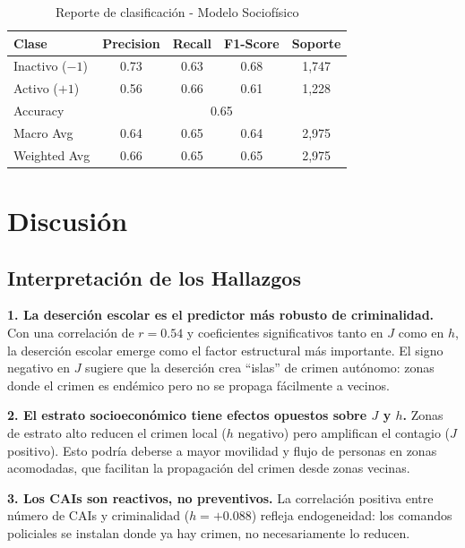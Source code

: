\documentclass[12pt,a4paper]{article}
\begin{document}
\begin{table}[H]
\centering
\caption{Reporte de clasificación - Modelo Sociofísico}
\label{tab:clasificacion}
\begin{tabular}{@{}lcccc@{}}
\toprule
\textbf{Clase} & \textbf{Precision} & \textbf{Recall} & \textbf{F1-Score} & \textbf{Soporte} \\
\midrule
Inactivo ($-1$) & 0.73 & 0.63 & 0.68 & 1,747 \\
Activo ($+1$) & 0.56 & 0.66 & 0.61 & 1,228 \\
\midrule
Accuracy & \multicolumn{4}{c}{0.65} \\
Macro Avg & 0.64 & 0.65 & 0.64 & 2,975 \\
Weighted Avg & 0.66 & 0.65 & 0.65 & 2,975 \\
\bottomrule
\end{tabular}
\end{table}

\section{Discusión}

\subsection{Interpretación de los Hallazgos}

\textbf{1. La deserción escolar es el predictor más robusto de criminalidad.} Con una correlación de $r=0.54$ y coeficientes significativos tanto en $J$ como en $h$, la deserción escolar emerge como el factor estructural más importante. El signo negativo en $J$ sugiere que la deserción crea ``islas'' de crimen autónomo: zonas donde el crimen es endémico pero no se propaga fácilmente a vecinos.

\textbf{2. El estrato socioeconómico tiene efectos opuestos sobre $J$ y $h$.} Zonas de estrato alto reducen el crimen local ($h$ negativo) pero amplifican el contagio ($J$ positivo). Esto podría deberse a mayor movilidad y flujo de personas en zonas acomodadas, que facilitan la propagación del crimen desde zonas vecinas.

\textbf{3. Los CAIs son reactivos, no preventivos.} La correlación positiva entre número de CAIs y criminalidad ($h=+0.088$) refleja endogeneidad: los comandos policiales se instalan donde ya hay crimen, no necesariamente lo reducen.
\end{document}
